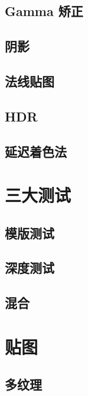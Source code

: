 \documentclass[UTF8,a4paper,12pt]{ctexbook}
\begin{document}
	
	
	
	\section{Gamma 矫正}
	
	
	
	
	\section{阴影}
	
	
	
	
	\section{法线贴图}
	
	
	
	\section{HDR}
	
	
	
	
	\section{延迟着色法}


	

\chapter{三大测试}
	\section{模版测试}
	
	
	\section{深度测试}
	
	
	\section{混合}
	
	
	
	
\chapter{贴图}

	\section{多纹理}
	
\end{document}
